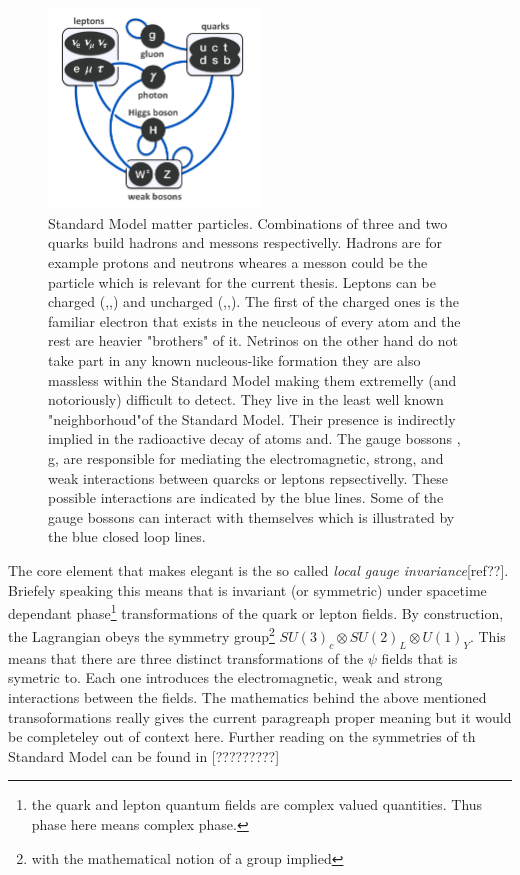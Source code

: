 \begin{figure}[h]
  \begin{center}
    \includegraphics[width=0.5\textwidth]{Figures/Chapter1/Standard_Model_Particles.png}
    \caption{Standard Model matter particles. Combinations of three and two quarks build hadrons and messons respectivelly.
    Hadrons are for example protons and neutrons wheares a messon could be the \Bs particle which is relevant for the current thesis.
    Leptons can be charged (\electron,\mmu,\mtau) and uncharged (\neue,\neum,\neut). The first of the charged ones is the familiar
    electron that exists in the neucleous of every atom and the rest are heavier "brothers" of it. Netrinos on the other hand
    do not take part in any known nucleous-like formation they are also massless within the Standard Model making them extremelly (and notoriously)
    difficult to detect. They live in the least well known "neighborhoud"of the Standard Model. Their presence is indirectly
    implied in the radioactive decay of atoms and. The gauge bossons \g, g, \Wpm \Z  are responsible for mediating the electromagnetic,
    strong, and weak interactions between quarcks or leptons repsectivelly. These possible interactions are indicated by the blue
    lines. Some of the gauge bossons can interact with themselves which is illustrated by the blue closed loop lines.}
    \label{sm_particles}
  \end{center}
\end{figure}

The core element that makes  elegant is the so called {\it local gauge invariance}[ref??].
Briefely speaking this means that  is invariant (or symmetric) under spacetime dependant
phase\footnote{the quark and lepton quantum fields are complex valued quantities. Thus phase here means complex phase.} transformations of the quark or lepton fields.
By construction, the Lagrangian obeys the symmetry
group\footnote{with the mathematical notion of a group implied} $SU(3)_c\otimes SU(2)_L\otimes U(1)_Y$.
This means that there are three distinct transformations of the $\psi$ fields that  is symetric to.
Each one introduces the electromagnetic, weak and strong interactions between the fields. The mathematics
behind the above mentioned transoformations really gives the current paragreaph proper meaning but it would
be completeley out of context here. Further reading on the symmetries of th Standard Model can be found in [?????????]

